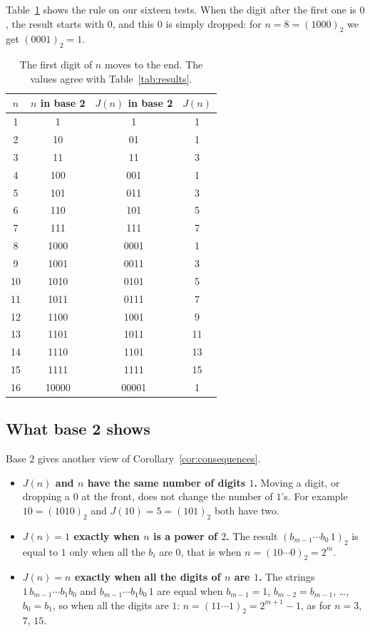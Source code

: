 Table~\ref{tab:binary} shows the rule on our sixteen tests. When the digit
after the first one is $0$, the result starts with $0$, and this $0$ is simply
dropped: for $n=8=(1000)_2$ we get $(0001)_2=1$.

\begin{table}[!ht]
\centering
\renewcommand{\arraystretch}{1.1}
\begin{tabular}{|c|c|c|c|}
\hline
$n$ & $n$ in base 2 & $J(n)$ in base 2 & $J(n)$\\ \hline
1 & 1 & 1 & 1\\
2 & 10 & 01 & 1\\
3 & 11 & 11 & 3\\
4 & 100 & 001 & 1\\
5 & 101 & 011 & 3\\
6 & 110 & 101 & 5\\
7 & 111 & 111 & 7\\
8 & 1000 & 0001 & 1\\
9 & 1001 & 0011 & 3\\
10 & 1010 & 0101 & 5\\
11 & 1011 & 0111 & 7\\
12 & 1100 & 1001 & 9\\
13 & 1101 & 1011 & 11\\
14 & 1110 & 1101 & 13\\
15 & 1111 & 1111 & 15\\
16 & 10000 & 00001 & 1\\ \hline
\end{tabular}
\caption{The first digit of $n$ moves to the end. The values agree with
Table~\ref{tab:results}.}
\label{tab:binary}
\end{table}

\subsection{What base 2 shows}

Base $2$ gives another view of Corollary~\ref{cor:consequences}.
\begin{itemize}
  \item \textbf{$J(n)$ and $n$ have the same number of digits $1$.} Moving a
        digit, or dropping a $0$ at the front, does not change the number of
        $1$'s. For example $10=(1010)_2$ and $J(10)=5=(101)_2$ both have two.
  \item \textbf{$J(n)=1$ exactly when $n$ is a power of $2$.} The result
        $(b_{m-1}\cdots b_0\,1)_2$ is equal to $1$ only when all the $b_i$ are
        $0$, that is when $n=(10\cdots0)_2=2^m$.
  \item \textbf{$J(n)=n$ exactly when all the digits of $n$ are $1$.} The
        strings $1\,b_{m-1}\cdots b_1b_0$ and $b_{m-1}\cdots b_1b_0\,1$ are equal
        when $b_{m-1}=1$, $b_{m-2}=b_{m-1}$, \dots, $b_0=b_1$, so when all the
        digits are $1$: $n=(11\cdots1)_2=2^{m+1}-1$, as for $n=3$, $7$, $15$.
\end{itemize}

